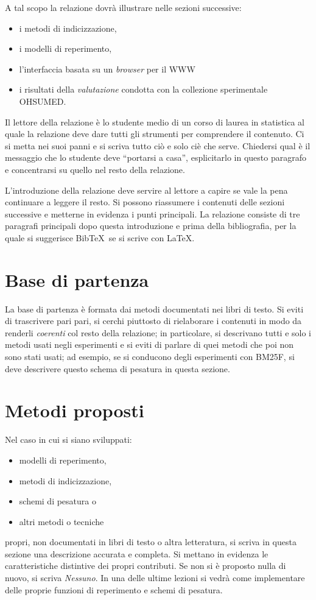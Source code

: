 \documentclass[runningheads]{llncs}
\begin{document}
A tal scopo la relazione dovr\`a illustrare nelle sezioni successive:
\begin{itemize}
\item i metodi di indicizzazione,
\item i modelli di reperimento,
\item l'interfaccia basata su un \textit{browser} per il {WWW}
\item i risultati della \emph{valutazione} condotta con la collezione
  sperimentale OHSUMED.
\end{itemize}
Il lettore della relazione \`e lo studente medio di un corso di laurea
in statistica al quale la relazione deve dare tutti gli strumenti per
comprendere il contenuto.  Ci si metta nei suoi panni e si scriva
tutto ci\`o e solo ci\`e che serve.  Chiedersi qual \`e il messaggio
che lo studente deve ``portarsi a casa'', esplicitarlo in questo
paragrafo e concentrarsi su quello nel resto della relazione.

L'introduzione della relazione deve servire al lettore a capire se
vale la pena continuare a leggere il resto.  Si possono riassumere i
contenuti delle sezioni successive e metterne in evidenza i punti
principali.  La relazione consiste di tre paragrafi principali dopo
questa introduzione e prima della bibliografia, per la quale si
suggerisce Bib\TeX\ se si scrive con \LaTeX.

\section{Base di partenza}
\label{sec:base-di-partenza}

La base di partenza \`e formata dai metodi documentati nei libri di
testo.  Si eviti di trascrivere pari pari, si cerchi piuttosto di
rielaborare i contenuti in modo da renderli \emph{coerenti} col resto
della relazione; in particolare, si descrivano tutti e solo i metodi
usati negli esperimenti e si eviti di parlare di quei metodi che poi
non sono stati usati; ad esempio, se si conducono degli esperimenti
con BM25F, si deve descrivere questo schema di pesatura in questa
sezione.

\section{Metodi proposti}
\label{sec:metodi-utilizzati}

Nel caso in cui si siano sviluppati:
\begin{itemize}
\item modelli di reperimento,
\item metodi di indicizzazione,
\item schemi di pesatura o
\item altri metodi o tecniche
\end{itemize}
propri, non documentati in libri di testo o altra letteratura, si
scriva in questa sezione una descrizione accurata e completa.  Si
mettano in evidenza le caratteristiche distintive dei propri
contributi.  Se non si \`e proposto nulla di nuovo, si scriva
\emph{Nessuno}.  In una delle ultime lezioni si vedr\`a come
implementare delle proprie funzioni di reperimento e schemi di
pesatura.
\end{document}
